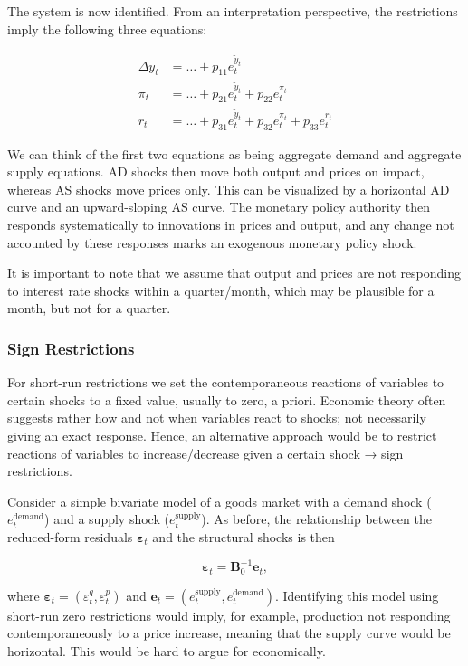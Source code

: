 The system is now identified. From an interpretation perspective, the restrictions imply the following three equations:

\begin{align*}
	\Delta y_t &= \dots + p_{11} e_t^{\tilde{y}_t} \\
	\pi_t &= \dots + p_{21} e_t^{\tilde{y}_t} + p_{22} e_t^{\pi_t} \\
	r_t &= \dots + p_{31} e_t^{\tilde{y}_t} + p_{32} e_t^{\pi_t} + p_{33} e_t^{r_t}
\end{align*}

We can think of the first two equations as being aggregate demand and aggregate supply equations. AD shocks then move both output and prices on impact, whereas AS shocks move prices only. This can be visualized by a horizontal AD curve and an upward-sloping AS curve. The monetary policy authority then responds systematically to innovations in prices and output, and any change not accounted by these responses marks an exogenous monetary policy shock. 

It is important to note that we assume that output and prices are not responding to interest rate shocks within a quarter/month, which may be plausible for a month, but not for a quarter.

\subsubsection{Sign Restrictions}

For short-run restrictions we set the contemporaneous reactions of variables to certain shocks to a fixed value, usually to zero, a priori. Economic theory often suggests rather how and not when variables react to shocks; not necessarily giving an exact response. Hence, an alternative approach would be to restrict reactions of variables to increase/decrease given a certain shock → sign restrictions.

Consider a simple bivariate model of a goods market with a demand shock ($e_t^{\text{demand}}$) and a supply shock ($e_t^{\text{supply}}$). As before, the relationship between the reduced-form residuals $\bm{\varepsilon}_t$ and the structural shocks is then 

\[
	\bm{\varepsilon}_t = \bm{B}_0^{-1}\bm{e}_t, 
\]

where $\bm{\varepsilon}_t = (\varepsilon_t^q,\varepsilon_t^p)$ and $\bm{e}_t = (e_t^{\text{supply}}, e_t^{\text{demand}})$. Identifying this model using short-run zero restrictions would imply, for example, production not responding contemporaneously to a price increase, meaning that the supply curve would be horizontal. This would be hard to argue for economically. 

